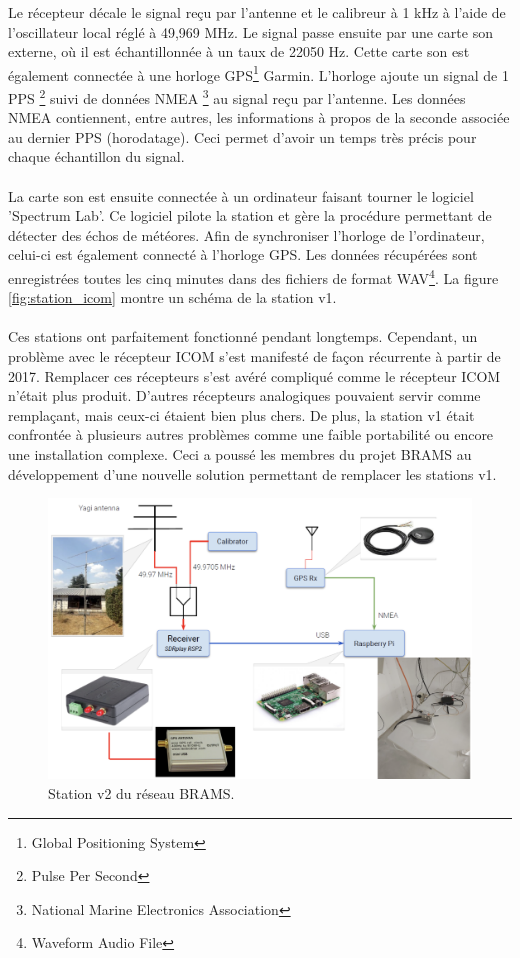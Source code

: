 \documentclass[11pt]{article}
\begin{document}
\newpage

Le récepteur décale le signal reçu par l'antenne et le calibreur à 1 kHz à l'aide de l'oscillateur local réglé à 49,969 MHz.
Le signal passe ensuite par une carte son externe, où il est échantillonnée à un taux de 22050 Hz.
Cette carte son est également connectée à une horloge GPS\footnote{Global Positioning System} Garmin.
L'horloge ajoute un signal de 1 PPS \footnote{Pulse Per Second} suivi de données NMEA \footnote{National Marine Electronics Association} au signal reçu par l'antenne.
Les données NMEA contiennent, entre autres, les informations à propos de la seconde associée au dernier PPS (horodatage).
Ceci permet d'avoir un temps très précis pour chaque échantillon du signal.
\\
\\
La carte son est ensuite connectée à un ordinateur faisant tourner le logiciel 'Spectrum Lab'.
Ce logiciel pilote la station et gère la procédure permettant de détecter des échos de météores.
Afin de synchroniser l'horloge de l'ordinateur, celui-ci est également connecté à l'horloge GPS.
Les données récupérées sont enregistrées toutes les cinq minutes dans des fichiers de format WAV\footnote{Waveform Audio File}.
La figure \ref{fig:station_icom} montre un schéma de la station v1.\\
\\
Ces stations ont parfaitement fonctionné pendant longtemps.
Cependant, un problème avec le récepteur ICOM s'est manifesté de façon récurrente à partir de 2017.
Remplacer ces récepteurs s'est avéré compliqué comme le récepteur ICOM n'était plus produit.
D'autres récepteurs analogiques pouvaient servir comme remplaçant, mais ceux-ci étaient bien plus chers.
De plus, la station v1 était confrontée à plusieurs autres problèmes comme une faible portabilité ou encore une installation complexe.
Ceci a poussé les membres du projet BRAMS au développement d'une nouvelle solution permettant de remplacer les stations v1.

\begin{figure}[h]
    \begin{center}
        \includegraphics[scale=0.3]{schema_rsp2.png}
        \caption{Station v2 du réseau BRAMS.}
        \label{fig:station_rsp2}
    \end{center}
\end{figure}
\end{document}
